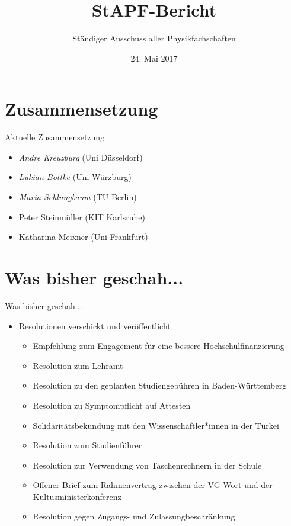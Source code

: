 \documentclass[compress, aspectratio=169]{beamer}
\title[StAPf-Bericht]{StAPF-Bericht}
\author{Ständiger Ausschuss aller Physikfachschaften}
\institute[Zusammenkunft aller Physikfachschaften]
\date{24. Mai 2017}
\begin{document}
\begin{frame}[plain]{}
  \titlepage
\end{frame}

\section{Zusammensetzung}

\begin{frame}{Aktuelle Zusammensetzung}
  \begin{itemize}
  \item \emph{Andre Kreuzburg} (Uni Düsseldorf)
  \item \emph{Lukian Bottke} (Uni Würzburg)
  \item \emph{Maria Schlungbaum} (TU Berlin)
  \item Peter Steinmüller (KIT Karlsruhe)
  \item Katharina Meixner (Uni Frankfurt)
  \end{itemize}
\end{frame}

\section{Was bisher geschah...}

\begin{frame}{Was bisher geschah...}
  \begin{itemize}
  \item Resolutionen verschickt und veröffentlicht
    \begin{itemize}
    \item Empfehlung zum Engagement für eine bessere Hochschulfinanzierung
    \item Resolution zum Lehramt
    \item Resolution zu den geplanten Studiengebühren in Baden-Württemberg
    \item Resolution zu Symptompflicht auf Attesten
    \item Solidaritätsbekundung mit den Wissenschaftler*innen in der Türkei
    \item Resolution zum Studienführer
    \item Resolution zur Verwendung von Taschenrechnern in der Schule
    \item Offener Brief zum Rahmenvertrag zwischen der VG Wort und der Kultusministerkonferenz
    \item Resolution gegen Zugangs- und Zulassungbeschränkung
    \end{itemize}
  \end{itemize}
\end{frame}
\end{document}
